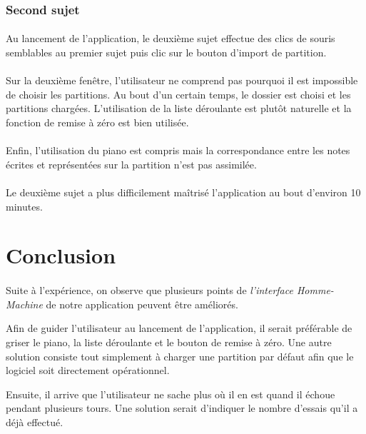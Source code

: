 \documentclass[a4paper, 12pt]{article}
\begin{document}
        \subsubsection{Second sujet}
        \paragraph{}
        Au lancement de l'application, le deuxième sujet effectue des clics de souris semblables au premier sujet puis clic sur le bouton d'import de partition.
        \paragraph{}
        Sur la deuxième fenêtre, l'utilisateur ne comprend pas pourquoi il est impossible de choisir les partitions. Au bout d'un certain temps, le dossier est choisi et les partitions chargées. L'utilisation de la liste déroulante est plutôt naturelle et la fonction de remise à zéro est bien utilisée.
        \paragraph{}
        Enfin, l'utilisation du piano est compris mais la correspondance entre les notes écrites et représentées sur la partition n'est pas assimilée.
        \paragraph{}
        Le deuxième sujet a plus difficilement maîtrisé l'application au bout d'environ 10 minutes.

\section{Conclusion}
    \paragraph{}
    Suite à l'expérience, on observe que plusieurs points de \emph{l'interface Homme-Machine} de notre application peuvent être améliorés.
    
    Afin de guider l'utilisateur au lancement de l'application, il serait préférable de griser le piano, la liste déroulante et le bouton de remise à zéro. Une autre solution consiste tout simplement à charger une partition par défaut afin que le logiciel soit  directement opérationnel.
    
    Ensuite, il arrive que l'utilisateur ne sache plus où il en est quand il échoue pendant plusieurs tours. Une solution serait d'indiquer le nombre d'essais qu'il a déjà effectué.
    
\end{document}
